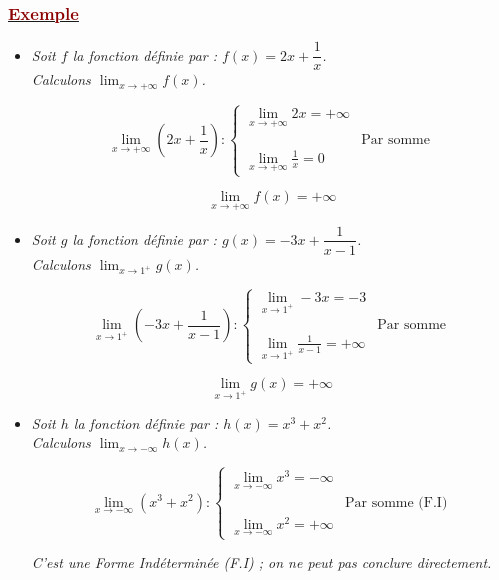 \documentclass[12pt,a4paper]{article}
\begin{document}
\subsubsection*{\underline{\textcolor{darkred}{ Exemple }}} 
\begin{itemize}
    \item \textit{Soit $f$ la fonction définie par : $f(x) = 2x + \dfrac{1}{x}$.} \\
    \textit{Calculons $\displaystyle \lim_{x \to +\infty} f(x)$.}
    
    \vspace{0.2cm}
    
    \[
    \lim_{x \to +\infty} \left(2x + \frac{1}{x}\right) :
    \begin{cases}
    \displaystyle \lim_{x \to +\infty} 2x = +\infty \\
    & \text{Par somme} \\
    \displaystyle \lim_{x \to +\infty} \frac{1}{x} = 0
    \end{cases}
    \]
    
    \[
    \boxed{\lim_{x \to +\infty} f(x) = +\infty}
    \]

    \vspace{0.4cm}

    \item \textit{Soit $g$ la fonction définie par : $g(x) = -3x + \dfrac{1}{x - 1}$.} \\
    \textit{Calculons $\displaystyle \lim_{x \to 1^+} g(x)$.}
    
    \vspace{0.2cm}
    
    \[
    \lim_{x \to 1^+} \left(-3x + \frac{1}{x - 1}\right) :
    \begin{cases}
    \displaystyle \lim_{x \to 1^+} -3x = -3 \\
    & \text{Par somme} \\
    \displaystyle \lim_{x \to 1^+} \frac{1}{x - 1} = +\infty
    \end{cases}
    \]
    
    \[
    \boxed{\lim_{x \to 1^+} g(x) = +\infty}
    \]

    \vspace{0.4cm}

    \item \textit{Soit $h$ la fonction définie par : $h(x) = x^3 + x^2$.} \\
    \textit{Calculons $\displaystyle \lim_{x \to -\infty} h(x)$.}
    
    \vspace{0.2cm}
    
    \[
    \lim_{x \to -\infty} (x^3 + x^2) :
    \begin{cases}
    \displaystyle \lim_{x \to -\infty} x^3 = -\infty \\
    & \text{Par somme (F.I)} \\
    \displaystyle \lim_{x \to -\infty} x^2 = +\infty
    \end{cases}
    \]
    
    \vspace{0.2cm}
    \textit{C'est une Forme Indéterminée (F.I) ; on ne peut pas conclure directement.}
\end{itemize}
\end{document}
